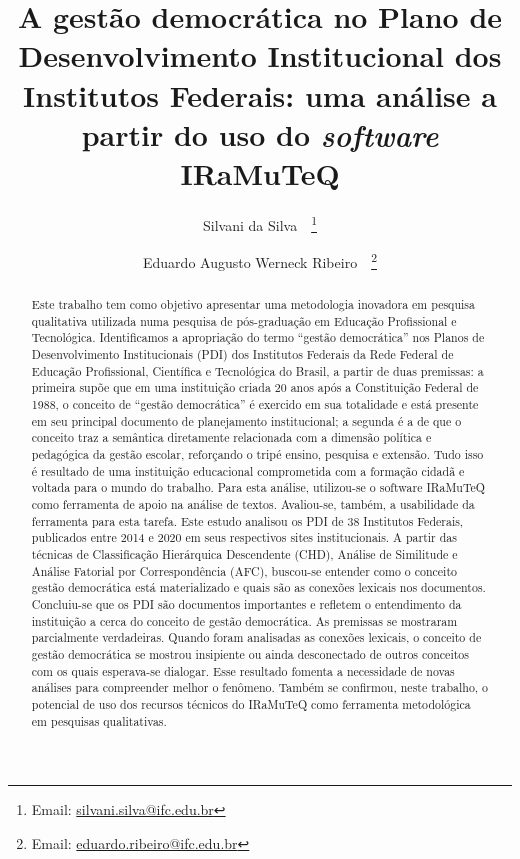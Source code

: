 \documentclass[portuguese]{textolivre}
\title{A gestão democrática no Plano de Desenvolvimento Institucional dos Institutos Federais: uma análise a partir do uso do \textit{software} IRaMuTeQ}
\author[1]{Silvani da Silva~\orcid{0000-0003-2207-6965}~\thanks{Email: \url{silvani.silva@ifc.edu.br}}}
\author[1]{Eduardo Augusto Werneck Ribeiro~\orcid{0000-0003-3313-6783}~\thanks{Email: \url{eduardo.ribeiro@ifc.edu.br}}}
\affil[1]{Instituto Federal Catarinense, Mestrado Profissional em Educação Profissional e Tecnológica, Blumenau, SC, Brasil.}
\begin{document}
\maketitle

\begin{polyabstract}
\begin{abstract}
Este trabalho tem como objetivo apresentar uma metodologia inovadora em pesquisa qualitativa utilizada numa pesquisa de pós-graduação em Educação Profissional e Tecnológica. Identificamos a apropriação do termo “gestão democrática” nos Planos de Desenvolvimento Institucionais (PDI) dos Institutos Federais da Rede Federal de Educação Profissional, Científica e Tecnológica do Brasil, a partir de duas premissas: a primeira supõe que em uma instituição criada 20 anos após a Constituição Federal de 1988, o conceito de “gestão democrática” é exercido em sua totalidade e está presente em seu principal documento de planejamento institucional; a segunda é a de que o conceito traz a semântica diretamente relacionada com a dimensão política e pedagógica da gestão escolar, reforçando o tripé ensino, pesquisa e extensão. Tudo isso é resultado de uma instituição educacional comprometida com a formação cidadã e voltada para o mundo do trabalho. Para esta análise, utilizou-se o software IRaMuTeQ como ferramenta de apoio na análise de textos. Avaliou-se, também, a usabilidade da ferramenta para esta tarefa. Este estudo analisou os PDI de 38 Institutos Federais, publicados entre 2014 e 2020 em seus respectivos sites institucionais. A partir das técnicas de Classificação Hierárquica Descendente (CHD), Análise de Similitude e Análise Fatorial por Correspondência (AFC), buscou-se entender como o conceito gestão democrática está materializado e quais são as conexões lexicais nos documentos. Concluiu-se que os PDI são documentos importantes e refletem o entendimento da instituição a cerca do conceito de gestão democrática. As premissas se mostraram parcialmente verdadeiras. Quando foram analisadas as conexões lexicais, o conceito de gestão democrática se mostrou insipiente ou ainda desconectado de outros conceitos com os quais esperava-se dialogar. Esse resultado fomenta a necessidade de novas análises para compreender melhor o fenômeno. Também se confirmou, neste trabalho, o potencial de uso dos recursos técnicos do IRaMuTeQ como ferramenta metodológica em pesquisas qualitativas.

\end{abstract}


\end{polyabstract}
\end{document}
